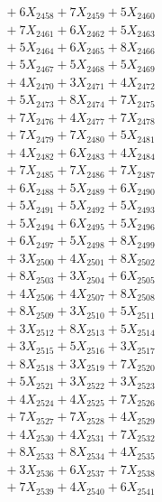 \documentclass[a4paper,10pt]{article}
\begin{document}
{\begin{align}
&\;  + 6 X_{2458} + 7 X_{2459} + 5 X_{2460} \\[0.3ex]
&\;  + 7 X_{2461} + 6 X_{2462} + 5 X_{2463} \\[0.3ex]
&\;  + 5 X_{2464} + 6 X_{2465} + 8 X_{2466} \\[0.3ex]
&\;  + 5 X_{2467} + 5 X_{2468} + 5 X_{2469} \\[0.5ex]\allowbreak
&\;  + 4 X_{2470} + 3 X_{2471} + 4 X_{2472} \\[0.3ex]
&\;  + 5 X_{2473} + 8 X_{2474} + 7 X_{2475} \\[0.3ex]
&\;  + 7 X_{2476} + 4 X_{2477} + 7 X_{2478} \\[0.3ex]
&\;  + 7 X_{2479} + 7 X_{2480} + 5 X_{2481} \\[0.3ex]
&\;  + 4 X_{2482} + 6 X_{2483} + 4 X_{2484} \\[0.3ex]
&\;  + 7 X_{2485} + 7 X_{2486} + 7 X_{2487} \\[0.3ex]
&\;  + 6 X_{2488} + 5 X_{2489} + 6 X_{2490} \\[0.3ex]
&\;  + 5 X_{2491} + 5 X_{2492} + 5 X_{2493} \\[0.3ex]
&\;  + 5 X_{2494} + 6 X_{2495} + 5 X_{2496} \\[0.3ex]
&\;  + 6 X_{2497} + 5 X_{2498} + 8 X_{2499} \\[0.5ex]\allowbreak
&\;  + 3 X_{2500} + 4 X_{2501} + 8 X_{2502} \\[0.3ex]
&\;  + 8 X_{2503} + 3 X_{2504} + 6 X_{2505} \\[0.3ex]
&\;  + 4 X_{2506} + 4 X_{2507} + 8 X_{2508} \\[0.3ex]
&\;  + 8 X_{2509} + 3 X_{2510} + 5 X_{2511} \\[0.3ex]
&\;  + 3 X_{2512} + 8 X_{2513} + 5 X_{2514} \\[0.3ex]
&\;  + 3 X_{2515} + 5 X_{2516} + 3 X_{2517} \\[0.3ex]
&\;  + 8 X_{2518} + 3 X_{2519} + 7 X_{2520} \\[0.3ex]
&\;  + 5 X_{2521} + 3 X_{2522} + 3 X_{2523} \\[0.3ex]
&\;  + 4 X_{2524} + 4 X_{2525} + 7 X_{2526} \\[0.3ex]
&\;  + 7 X_{2527} + 7 X_{2528} + 4 X_{2529} \\[0.5ex]\allowbreak
&\;  + 4 X_{2530} + 4 X_{2531} + 7 X_{2532} \\[0.3ex]
&\;  + 8 X_{2533} + 8 X_{2534} + 4 X_{2535} \\[0.3ex]
&\;  + 3 X_{2536} + 6 X_{2537} + 7 X_{2538} \\[0.3ex]
&\;  + 7 X_{2539} + 4 X_{2540} + 6 X_{2541} \\[0.3ex]

\end{align}}
\end{document}
